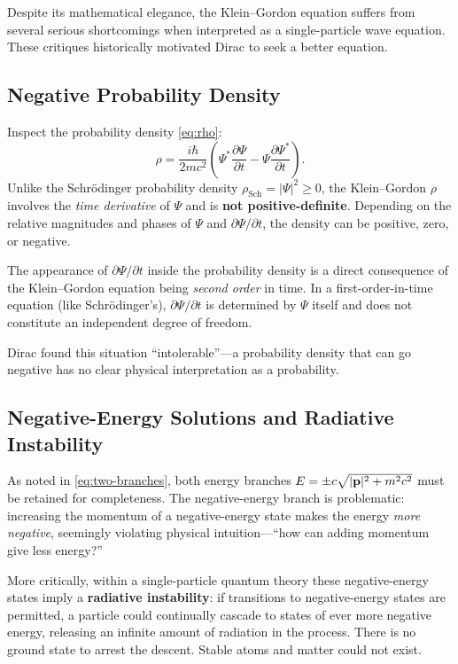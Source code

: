 \documentclass[12pt, a4paper]{article}
\theoremstyle{definition}
\begin{document}
Despite its mathematical elegance, the Klein--Gordon equation suffers from
several serious shortcomings when interpreted as a single-particle wave
equation.  These critiques historically motivated Dirac to seek a better
equation.

\subsection{Negative Probability Density}

Inspect the probability density \eqref{eq:rho}:
\begin{equation}
    \rho = \frac{i\hbar}{2mc^{2}}
      \left(
        \Psi^{*}\frac{\partial\Psi}{\partial t}
        - \Psi\frac{\partial\Psi^{*}}{\partial t}
      \right).
\end{equation}
Unlike the Schr\"{o}dinger probability density $\rho_{\text{Sch}} =
|\Psi|^{2} \geq 0$, the Klein--Gordon $\rho$ involves the \emph{time
derivative} of $\Psi$ and is \textbf{not positive-definite}.  Depending on
the relative magnitudes and phases of $\Psi$ and $\partial\Psi/\partial t$,
the density can be positive, zero, or negative.

\begin{warning}
The appearance of $\partial\Psi/\partial t$ inside the probability density
is a direct consequence of the Klein--Gordon equation being \emph{second
order} in time.  In a first-order-in-time equation (like Schr\"{o}dinger's),
$\partial\Psi/\partial t$ is determined by $\Psi$ itself and does not
constitute an independent degree of freedom.
\end{warning}

Dirac found this situation ``intolerable''---a probability density that can
go negative has no clear physical interpretation as a probability.

\subsection{Negative-Energy Solutions and Radiative Instability}

As noted in \eqref{eq:two-branches}, both energy branches $E = \pm
c\sqrt{|\vb{p}|^{2}+m^{2}c^{2}}$ must be retained for completeness.
The negative-energy branch is problematic: increasing the momentum of a
negative-energy state makes the energy \emph{more negative}, seemingly
violating physical intuition---``how can adding momentum give less energy?''

More critically, within a single-particle quantum theory these negative-energy
states imply a \textbf{radiative instability}: if transitions to
negative-energy states are permitted, a particle could continually cascade to
states of ever more negative energy, releasing an infinite amount of radiation
in the process.  There is no ground state to arrest the descent.  Stable atoms
and matter could not exist.
\end{document}
